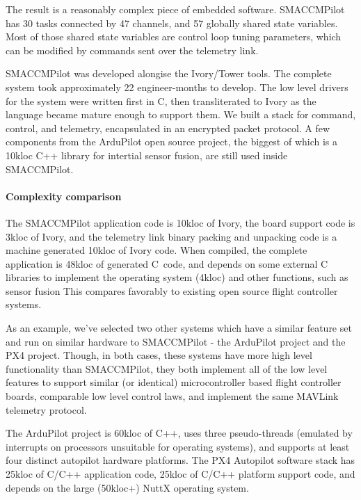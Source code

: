 The result is a reasonably complex piece of embedded software. SMACCMPilot has
30 tasks connected by 47 channels, and 57 globally shared state variables. Most
of those shared state variables are control loop tuning parameters, which can be
modified by commands sent over the telemetry link.

SMACCMPilot was developed alongise the Ivory/Tower tools.  The complete system
took approximately 22 engineer-months to develop.  The low level drivers for the
system were written first in C, then transliterated to Ivory as the language
became mature enough to support them. We built a stack for command, control, and
telemetry, encapsulated in an encrypted packet protocol. A few components from
the ArduPilot open source project, the biggest of which is a 10kloc C++ library
for intertial sensor fusion, are still used inside SMACCMPilot.

\paragraph{Complexity comparison}
The SMACCMPilot application code is 10kloc of Ivory, the board support code
is 3kloc of Ivory, and the telemetry link binary packing and unpacking
code is a machine generated 10kloc of Ivory code. When compiled, the complete
application
is 48kloc of generated C~code, and depends on some external C libraries to
implement the operating system (4kloc) and other functions, such as sensor
fusion  This compares favorably to existing open
source flight controller systems.

As an example, we've selected two other systems which have a similar feature set
and run on similar hardware to SMACCMPilot - the ArduPilot
project\cite{apm-proj} and the PX4 project. Though, in
both cases, these systems have more high level functionality than SMACCMPilot,
they both implement all of the low level features to support similar (or
identical) microcontroller based flight controller boards, comparable low level
control laws, and implement the same MAVLink telemetry protocol.

The ArduPilot project is 60kloc of C++, uses three pseudo-threads (emulated by
interrupts on processors unsuitable for operating systems), and supports at
least four distinct autopilot hardware platforms. The PX4 Autopilot software
stack has 25kloc of C/C++ application code, 25kloc of C/C++ platform support
code, and depends on the large (50kloc+) NuttX operating system.

